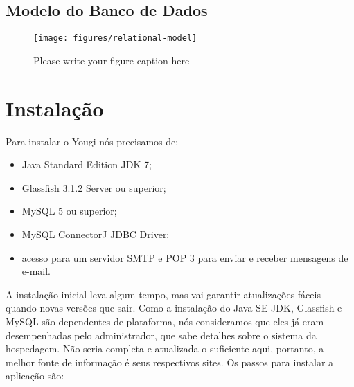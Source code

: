 \documentclass[envcountsame,envcountchap,letterpaper]{svmono}
\begin{document}
\section{Modelo do Banco de Dados}

\begin{figure}
\centering
\texttt{[image: figures/relational-model]}
\caption{Please write your figure caption here}
\label{fig:1}
\end{figure}

\chapter{Instalação}

Para instalar o Yougi nós precisamos de:

\begin{itemize}
\item Java Standard Edition JDK 7;
\item Glassfish 3.1.2 Server ou superior;
\item MySQL 5 ou superior;
\item MySQL ConnectorJ JDBC Driver;
\item acesso para um servidor SMTP e POP 3 para enviar e receber 			  mensagens de e-mail.
\end{itemize}

A instalação inicial leva algum tempo, mas vai garantir atualizações fáceis quando novas versões que sair. Como a instalação do Java SE JDK, Glassfish e MySQL são dependentes de plataforma, nós consideramos que eles já eram desempenhadas pelo administrador, que sabe detalhes sobre o sistema da hospedagem. Não seria completa e atualizada o suficiente aqui, portanto, a melhor fonte de informação é seus respectivos sites. Os passos para instalar a aplicação são:
\end{document}

